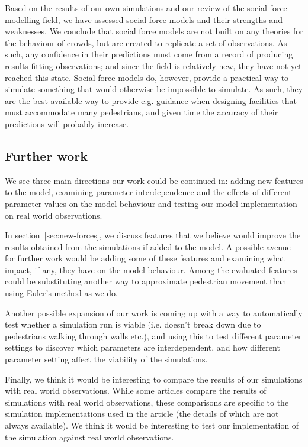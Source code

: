 Based on the results of our own simulations and our review of the social force 
modelling field, we have assessed social force models and their strengths and 
weaknesses. We conclude that social force models are not built on any theories 
for the behaviour of crowds, but are created to replicate a set of 
observations. As such, any confidence in their predictions must come from a 
record of producing results fitting observations; and since the field is 
relatively new, they have not yet reached this state. Social force models do, 
however, provide a practical way to simulate something that would otherwise be 
impossible to simulate. As such, they are the best available way to provide 
e.g. guidance when designing facilities that must accommodate many 
pedestrians, and given time the accuracy of their predictions will probably 
increase.


\subsection{Further work}
We see three main directions our work could be continued in: adding new 
features to the model, examining parameter interdependence and the effects of 
different parameter values on the model behaviour and testing our model 
implementation on real world observations.

In section~\ref{sec:new-forces}, we discuss features that we believe would 
improve the results obtained from the simulations if added to the model. A 
possible avenue for further work would be adding some of these features and 
examining what impact, if any, they have on the model behaviour. Among the 
evaluated features could be substituting another way to approximate pedestrian 
movement than using Euler's method as we do.

Another possible expansion of our work is coming up with a way to 
automatically test whether a simulation run is viable (i.e. doesn't break down 
due to pedestrians walking through walls etc.), and using this to test 
different parameter settings to discover which parameters are interdependent, 
and how different parameter setting affect the viability of the simulations.

Finally, we think it would be interesting to compare the results of our 
simulations with real world observations. While some articles compare 
the results of simulations with real world observations, these comparisons are 
specific to the simulation implementations used in the article (the details of 
which are not always available). We think it would be interesting to test our 
implementation of the simulation against real world observations.
